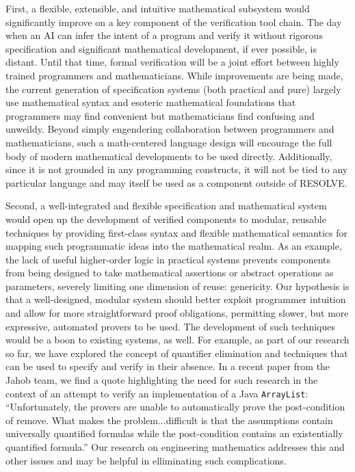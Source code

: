First, a flexible, extensible, and intuitive mathematical subsystem would significantly improve on a key component of the verification tool chain.  The day when an AI can infer the intent of a program and verify it without rigorous specification and significant mathematical development, if ever possible, is distant.  Until that time, formal verification will be a joint effort between highly trained programmers and mathematicians.  While improvements are being made\cite{wenzelIsar}, the current generation of specification systems (both practical and pure) largely use mathematical syntax and esoteric mathematical foundations that programmers may find convenient but mathematicians find confusing and unweildy.  Beyond simply engendering collaboration between programmers and mathematicians, such a math-centered language design will encourage the full body of modern mathematical developments to be used directly.  Additionally, since it is not grounded in any programming constructs, it will not be tied to any particular language and may itself be used as a component outside of RESOLVE.

Second, a well-integrated and flexible specification and mathematical system would open up the development of verified components to modular, reusable techniques by providing first-class syntax and flexible mathematical semantics for mapping such programmatic ideas into the mathematical realm.  As an example, the lack of useful higher-order logic in practical systems prevents components from being designed to take mathematical assertions or abstract operations as parameters, severely limiting one dimension of reuse: genericity\cite{bronishMap}.  Our hypothesis is that a well-designed, modular system should better exploit programmer intuition and allow for more straightforward proof obligations, permitting slower, but more expressive, automated provers to be used.  The development of such techniques would be a boon to existing systems, as well.  For example, as part of our research so far, we have explored the concept of quantifier elimination and techniques that can be used to specify and verify in their absence.  In a recent paper from the Jahob team, we find a quote highlighting the need for such research in the context of an attempt to verify an implementation of a Java \texttt{ArrayList}: ``Unfortunately, the provers are unable to automatically prove the post-condition of remove.  What makes the problem...difficult is that the assumptions contain universally quantified formulas while the post-condition contains an existentially quantified formula.''  Our research on engineering mathematics addresses this and other issues and may be helpful in elliminating such complications.

